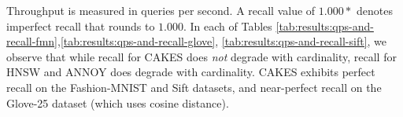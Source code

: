   Throughput is measured in queries per second. A recall value of $1.000*$ denotes imperfect recall that rounds to $1.000$. In each of Tables \ref{tab:results:qps-and-recall-fmn},\ref{tab:results:qps-and-recall-glove}, \ref{tab:results:qps-and-recall-sift}, we observe that while recall for CAKES does \emph{not} degrade with cardinality, recall for
  HNSW and ANNOY does degrade with cardinality. CAKES exhibits perfect recall on the Fashion-MNIST and Sift datasets, and near-perfect recall on the Glove-25 dataset (which uses cosine distance). 



